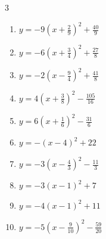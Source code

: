 \begin{multicols}{3}
\begin{enumerate}

  \item $\displaystyle y=-9\left( x+\frac{2}{9}\right)^{2}+\frac{40}{9}$


  \item $\displaystyle y=-6\left( x+\frac{3}{4}\right)^{2}+\frac{27}{8}$


  \item $\displaystyle y=-2\left( x-\frac{9}{4}\right)^{2}+\frac{41}{8}$


  \item $\displaystyle y=4\left( x+\frac{3}{8}\right)^{2}-\frac{105}{16}$


  \item $\displaystyle y=6\left( x+\frac{1}{6}\right)^{2}-\frac{31}{6}$


  \item $\displaystyle y=-\left( x-4\right)^{2}+22$

        \phantom{$\displaystyle 頂点\left( 4 , 22 \right)$}

  \item $\displaystyle y=-3\left( x-\frac{4}{3}\right)^{2}-\frac{11}{3}$


  \item $\displaystyle y=-3\left( x-1\right)^{2}+7$

        \phantom{$\displaystyle 頂点\left( 1 , 7 \right)$}

  \item $\displaystyle y=-4\left( x-1\right)^{2}+11$

        \phantom{$\displaystyle 頂点\left( 1 , 11 \right)$}

  \item $\displaystyle y=-5\left( x-\frac{9}{10}\right)^{2}-\frac{59}{20}$


\end{enumerate}
\end{multicols}
